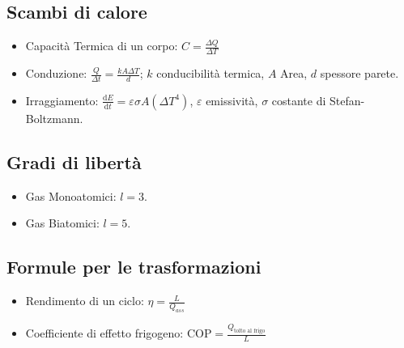 \documentclass[a4paper,11pt]{article}
\newcommand{\de}[0]{\mbox{d}}
\begin{document}
\subsection*{Scambi di calore}
\begin{itemize}
\item Capacit\`a Termica di un corpo: $C = \frac{\Delta Q}{\Delta T}$
\item Conduzione: $\frac{Q}{\Delta t} = \frac{k A \Delta T}{d}$; $k$ conducibilit\`a termica, $A$ Area, $d$ spessore parete.
\item Irraggiamento: $\frac{\de E}{\de t} = \varepsilon \sigma A (\Delta T^4)$, $\varepsilon$ emissivit\`a, $\sigma$ costante di Stefan-Boltzmann.
\end{itemize}

\subsection*{Gradi di libert\`a}
\begin{itemize}
\item Gas Monoatomici: $l=3$.
\item Gas Biatomici: $l=5$.
\end{itemize}

\subsection*{Formule per le trasformazioni}
\begin{itemize}
\item Rendimento di un ciclo: $\eta = \frac{L}{Q_{ass}}$
\item Coefficiente di effetto frigogeno: $\mbox{COP} = \frac{Q_{\mbox{tolto al frigo}}}{L}$
\end{itemize}
\end{document}

